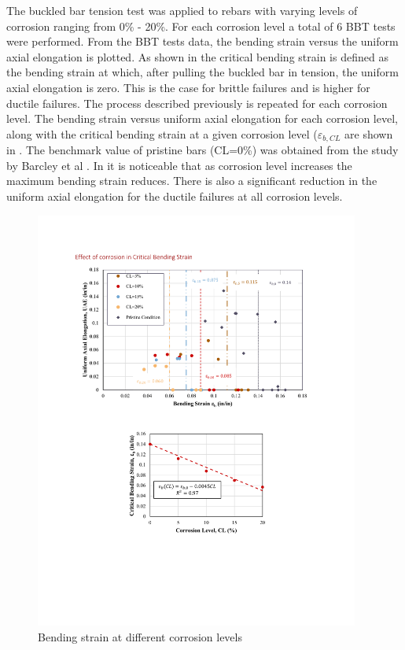 The buckled bar tension test was applied to rebars with varying levels of corrosion ranging from 0\% - 20\%. For each corrosion level a total of 6 BBT tests were performed. From the BBT tests data, the bending strain versus the uniform axial elongation is plotted. As shown in  the critical bending strain is defined as the bending strain at which, after pulling the buckled bar in  tension, the uniform axial elongation is zero. This is the case for brittle failures and is higher for ductile failures. The process described previously is repeated for each corrosion level. The bending strain versus uniform axial elongation for each corrosion level, along with the critical bending strain at a given corrosion level ($\varepsilon_{b,CL}$ are shown in  . The benchmark value of pristine bars (CL=0\%) was obtained from the study by Barcley et al \cite{Barcley2018}. In  it is noticeable that as corrosion level increases the maximum bending strain reduces. There is also a significant reduction in the uniform axial elongation for the ductile failures at all corrosion levels.

\begin{figure}[htbp]
	\centering
	\includegraphics[width=0.95\textwidth]{VAC Thesis 2.0/Chapter-4/figs/BBT_results_.pdf}
	\caption{Bending strain at different corrosion levels}
	\label{fig:BBT_strains}
\end{figure}


